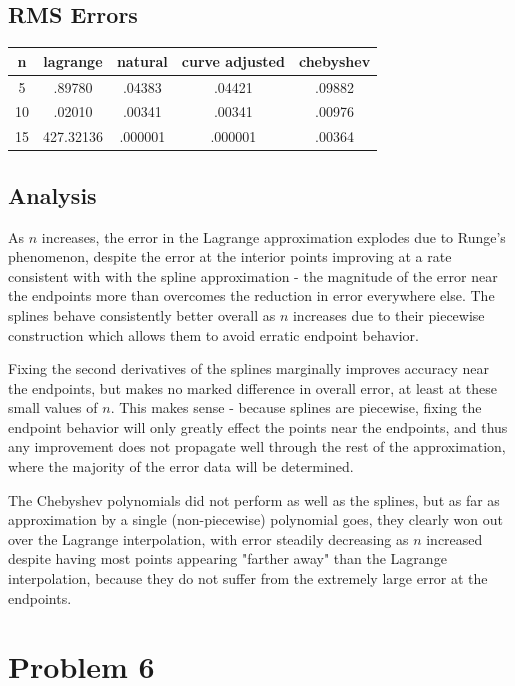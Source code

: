 \documentclass[11pt]{article} %
\begin{document}
\subsection*{RMS Errors}
{\renewcommand{\arraystretch}{1.3} %
\begin{tabular}{| c | c c c c |}
\hline
n & lagrange & natural & curve adjusted & chebyshev\\
\hline
5 & .89780 & .04383 & .04421 & .09882 \\
10 & .02010 & .00341 & .00341 & .00976\\
15 & 427.32136 & .000001&  .000001 & .00364\\
\hline
\end{tabular}
\subsection*{Analysis}

As $n$ increases, the error in the Lagrange approximation explodes due to Runge's phenomenon, despite the error at the interior points improving at a rate consistent with
with the spline approximation - the magnitude of the error near the endpoints more than overcomes the reduction in error everywhere else. The splines behave consistently better
overall as $n$ increases due to their piecewise construction which allows them to avoid erratic endpoint behavior. 
\par Fixing the second derivatives of the splines marginally improves
accuracy near the endpoints, but makes no marked difference in overall error, at least at these small values of $n$. This makes sense - because splines are piecewise, fixing the endpoint
behavior will only greatly effect the points near the endpoints, and thus any improvement does not propagate well through the rest of the approximation, where the majority of the 
error data will be determined.
\par The Chebyshev polynomials did not perform as well as the splines, but as far as approximation by a single (non-piecewise) polynomial goes, they clearly won out over the Lagrange interpolation,
with error steadily decreasing as $n$ increased despite having most points appearing "farther away" than the Lagrange interpolation, because they do not suffer from the extremely large error  at the endpoints.

\newpage
\section*{Problem 6}
}
\end{document}
